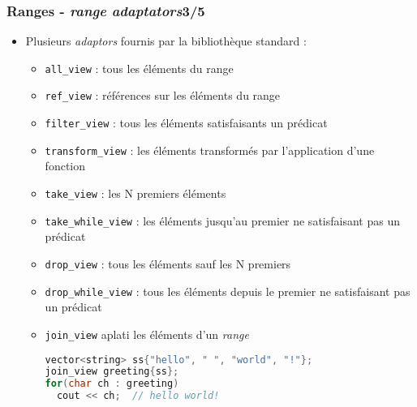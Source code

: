 \documentclass[C++.tex]{subfiles}
\begin{document}
\begin{frame}[fragile]
	\frametitle{Ranges - \textit{range adaptators}\titlehfill{}3/5}
	\begin{itemize}
		\item Plusieurs \textit{adaptors} fournis par la bibliothèque standard :


		\begin{itemize}
			\item \lstinline|all_view| : tous les éléments du range
			\item \lstinline|ref_view| : références sur les éléments du range
			\item \lstinline|filter_view| : tous les éléments satisfaisants un prédicat 
			\item \lstinline|transform_view| : les éléments transformés par l'application d'une fonction 
			\item \lstinline|take_view| : les N premiers éléments
			\item \lstinline|take_while_view| : les éléments jusqu'au premier ne satisfaisant pas un prédicat
			\item \lstinline|drop_view| : tous les éléments sauf les N premiers
			\item \lstinline|drop_while_view| : tous les éléments depuis le premier ne satisfaisant pas un prédicat
			\item \lstinline|join_view| \og aplati\fg{} les éléments d'un \textit{range}

			\begin{lstlisting}[language=C++]
vector<string> ss{"hello", " ", "world", "!"};
join_view greeting{ss};
for(char ch : greeting)
  cout << ch;  // hello world!\end{lstlisting}
			\end{itemize}
	\end{itemize}
\end{frame}
\end{document}
